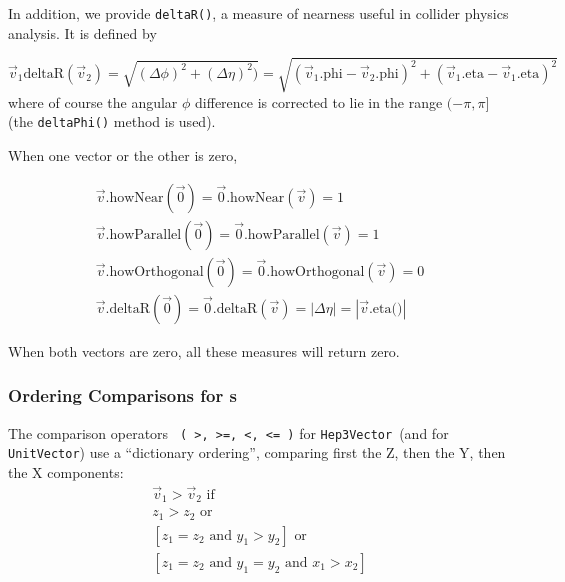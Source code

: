 \documentclass[twoside,12pt]{article}
\def \SV {{\tt Hep3Vector}}
\def \UV {{\tt UnitVector}}
\begin{document}
In addition, we provide \verb$deltaR()$,
a measure of nearness useful in collider physics analysis.
It is defined by

\begin{equation}
\vec{v}_{1} \mbox{deltaR} (\vec{v}_{2}) =
  \sqrt{ (\Delta \phi)^2 + (\Delta \eta)^2) } =
  \sqrt{ \left( \vec{v}_{1}\mbox{.phi} - \vec{v}_{2}\mbox{.phi} \right)^2 +
  \left( \vec{v}_{1}\mbox{.eta} - \vec{v}_{1}\mbox{.eta}  \right)^2 }
  \label{eq:deltaR}
\end{equation}
\noindent
where of course the angular $\phi$ difference is corrected to lie in the range
$(-\pi, \pi]$ (the {\tt deltaPhi()} method is used).

When one vector or the other is zero,

\begin{eqnarray}
\vec{v} \mbox{.howNear} (\vec{0}) =
  \vec{0} \mbox{.howNear} (\vec{v}) = 1
  \label{eq:howNear:3}
  \\
\vec{v} \mbox{.howParallel} (\vec{0}) =
  \vec{0} \mbox{.howParallel} (\vec{v}) = 1
  \label{eq:howPar:2}
  \\
\vec{v} \mbox{.howOrthogonal} (\vec{0}) =
  \vec{0} \mbox{.howOrthogonal} (\vec{v}) = 0
  \label{eq:howOrtho:2}
  \\
\vec{v} \mbox{.deltaR} (\vec{0}) = \vec{0} \mbox{.deltaR} (\vec{v}) =
  \left| \Delta \eta \right| =
  \left| \vec{v}\mbox{.eta()} \right|
  \label{eq:deltaR:2}
\end{eqnarray}

When both vectors are zero, all these measures will return zero.

\subsubsection{Ordering Comparisons for \protect\SV s}

The comparison operators \verb$ ( >, >=, <, <= )$ for \SV\ (and for
\UV) use a ``dictionary ordering'',
comparing first the Z, then the Y, then the
X components:
\begin{eqnarray}
  \vec{v}_1 > \vec{v}_2 \mbox{ if }	\nonumber \\
	z_1 > z_2 \mbox { or } \nonumber \\
	\left[
	z_1 = z_2 \mbox { and }
	y_1 > y_2 \right] \mbox { or } \nonumber \\
	\left[
	z_1 = z_2 \mbox { and }
	y_1 = y_2 \mbox { and }
	x_1 > x_2 \right]
  \label{eq:compSV}
\end{eqnarray}
\end{document}
